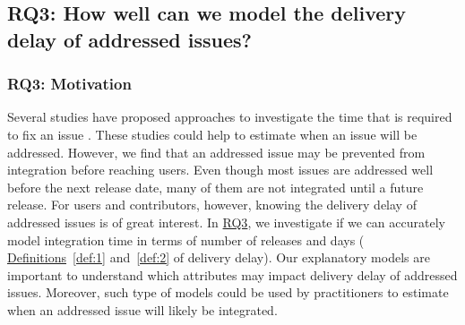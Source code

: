 \subsection{RQ3: How well can we model the delivery delay of
addressed issues?}\label{ch4:rq3}

\subsubsection*{RQ3: Motivation} 

Several studies have proposed approaches to investigate the time that is
required to fix an issue \cite{Anbalagan2009,Giger2010, Kim2006, Marks2011,
Weib2007, Zhang2013}. These studies could help to estimate when an issue will be
addressed. However, we find that an addressed issue may be prevented from integration
before reaching users. Even though most issues are addressed well before the next
release date, many of them are not integrated until a future release. For users
and contributors, however, knowing the delivery delay of addressed issues is of
great interest. In \hyperref[ch4:rq3]{RQ3}, we investigate if we can accurately model integration
time in terms of number of releases and days (\ie
\hyperref[def:1]{Definitions}~\ref{def:1} and~\ref{def:2} of delivery delay).
Our explanatory models are important to understand which attributes may impact
delivery delay of addressed issues. Moreover, such type of models could be used by
practitioners to estimate when an addressed issue will likely be integrated.

